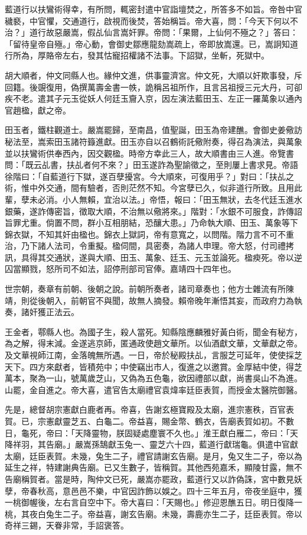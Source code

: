 \begin{pinyinscope}
藍道行以扶鸞術得幸，有所問，輒密封遣中官詣壇焚之，所答多不如旨。帝咎中官穢褻，中官懼，交通道行，啟視而後焚，答始稱旨。帝大喜，問：「今天下何以不治？」道行故惡嚴嵩，假乩仙言嵩奸罪。帝問：「果爾，上仙何不殛之？」答曰：「留待皇帝自殛。」帝心動，會御史鄒應龍劾嵩疏上，帝即放嵩還。已，嵩詗知道行所為，厚賂帝左右，發其怙寵招權諸不法事。下詔獄，坐斬，死獄中。

胡大順者，仲文同縣人也。緣仲文進，供事靈濟宮。仲文死，大順以奸欺事發，斥回籍。後覬復用，偽撰萬壽金書一帙，詭稱呂祖所作，且言呂祖授三元大丹，可卻疾不老。遣其子元玉從妖人何廷玉齎入京，因左演法藍田玉、左正一羅萬象以通內官趙楹，獻之帝。

田玉者，鐵柱觀道士。嚴嵩罷歸，至南昌，值聖誕，田玉為帝建醮。會御史姜儆訪秘法至，嵩索田玉諸符籙進獻。田玉亦自以召鶴術託儆附奏，得召為演法，與萬象並以扶鸞術供奉西內，因交觀楹。時帝方幸此三人，故大順書由三人進。帝覽書問：「既云乩書，扶乩者何不來？」田玉遂詐為聖諭徵之，至則屢上書求見。帝語徐階曰：「自藍道行下獄，遂百孽擾宮。今大順來，可復用乎？」對曰：「扶乩之術，惟中外交通，間有驗者，否則茫然不知。今宮孽已久，似非道行所致。且用此輩，孽未必消。小人無賴，宜治以法。」帝悟，報曰：「田玉無狀，去冬代廷玉進水銀藥，遂詐傳密旨，徵取大順，不治無以儆將來。」階對：「水銀不可服食，詐傳詔旨罪尤重。倘置不問，群小互相朋結，恐釀大患。」乃命執大順、田玉、萬象等下錦衣獄，不知其奸由楹也。錦衣上獄詞，帝有意寬之，以問階。階力言不可不重治，乃下諸人法司，令重擬。楹伺間，具密奏，為諸人申理。帝大怒，付司禮拷訊，具得其交通狀，遂與大順、田玉、萬象、廷玉、元玉並論死。楹瘐死。帝以逆囚當顯戮，怒所司不如法，詔停刑部司官俸。嘉靖四十四年也。

世宗朝，奏章有前朝、後朝之說。前朝所奏者，諸司章奏也；他方士雜流有所陳靖，則從後朝入，前朝官不與聞，故無人摘發。賴帝晚年漸悟其妄，而政府力為執奏，諸奸獲正法云。

王金者，鄠縣人也。為國子生，殺人當死。知縣陰應麟雅好黃白術，聞金有秘方，為之解，得末減。金遂逃京師，匿通政使趙文華所。以仙酒獻文華，文華獻之帝。及文華視師江南，金落魄無所遇。一日，帝於秘殿扶乩，言服芝可延年，使使採芝天下。四方來獻者，皆積苑中；中使竊出市人，復進之以邀賞。金厚結中使，得芝萬本，聚為一山，號萬歲芝山，又偽為五色龜，欲因禮部以獻，尚書吳山不為進。山罷，金自進之。帝大喜，遣官告太廟禮官袁煒率廷臣表賀，而授金太醫院御醫。

先是，總督胡宗憲獻白鹿者再。帝喜，告謝玄極寶殿及太廟，進宗憲秩，百官表賀。已，宗憲獻靈芝五、白龜二。帝益喜，賜金幣、鶴衣，告廟表賀如初。不數日，龜死，帝曰：「天降靈物，朕固疑處塵寰不久也。」淮王獻白雁二，帝曰：「天降祥羽，其告廟。」嚴嵩孫鵠獻玉兔一、靈芝六十四，藍道行獻瑞龜。俱遣中官獻太廟，廷臣表賀。未幾，兔生二子，禮官請謝玄告廟。是月，兔又生二子，帝以為延生之祥，特建謝典告廟。已又生數子，皆稱賀。其他西苑嘉禾，顯陵甘露，無不告廟稱賀者。當是時，陶仲文已死，嚴嵩亦罷政，藍道行又以詐偽誅，宮中數見妖孽，帝春秋高，意邑邑不樂，中官因詐飾以娛之。四十三年五月，帝夜坐庭中，獲一桃御幄後，左右言自空中下。帝大喜曰：「天賜也。」修迎恩醮五日。明日復降一桃，其夜白兔生二子。帝益喜，謝玄告廟。未幾，壽鹿亦生二子，廷臣表賀。帝以奇祥三錫，天眷非常，手詔褒答。


\end{pinyinscope}
